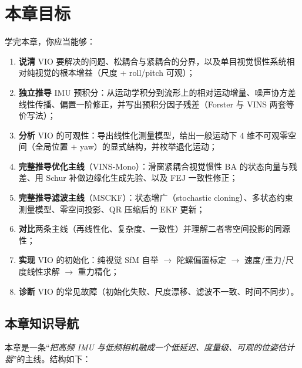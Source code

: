 \section*{本章目标}
学完本章，你应当能够：
\begin{enumerate}
  \item \textbf{说清} VIO 要解决的问题、松耦合与紧耦合的分界，以及单目视觉惯性系统相对纯视觉的根本增益（尺度 + roll/pitch 可观）；
  \item \textbf{独立推导} IMU 预积分：从运动学积分到流形上的相对运动增量、噪声协方差线性传播、偏置一阶修正，并写出预积分因子残差（Forster 与 VINS 两套等价写法）；
  \item \textbf{分析} VIO 的可观性：导出线性化测量模型，给出一般运动下 $4$ 维不可观零空间（全局位置 $+$ yaw）的显式结构，并枚举退化运动；
  \item \textbf{完整推导优化主线}（VINS-Mono）：滑窗紧耦合视觉惯性 BA 的状态向量与残差、用 Schur 补做边缘化生成先验、以及 FEJ 一致性修正；
  \item \textbf{完整推导滤波主线}（MSCKF）：状态增广（stochastic cloning）、多状态约束测量模型、零空间投影、QR 压缩后的 EKF 更新；
  \item \textbf{对比}两条主线（再线性化、复杂度、一致性）并理解二者零空间投影的同源性；
  \item \textbf{实现} VIO 的初始化：纯视觉 SfM 自举 $\to$ 陀螺偏置标定 $\to$ 速度/重力/尺度线性求解 $\to$ 重力精化；
  \item \textbf{诊断} VIO 的常见故障（初始化失败、尺度漂移、滤波不一致、时间不同步）。
\end{enumerate}

\subsection*{本章知识导航}
本章是一条“\emph{把高频 IMU 与低频相机融成一个低延迟、度量级、可观的位姿估计器}”的主线。结构如下：

